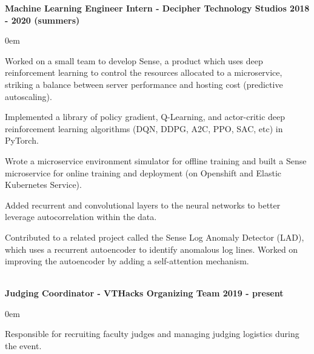 \documentclass{article}
\begin{document}
\begin{center}
\begin{flushleft}
    \textbf{Machine Learning Engineer Intern - Decipher Technology Studios \hfill 2018 - 2020 (summers)}
    \begin{compactitem}
      \itemsep0em
      \item Worked on a small team to develop Sense, a product which uses deep reinforcement learning to control the resources allocated to a microservice, striking a balance between server performance and hosting cost (predictive autoscaling).
      \item Implemented a library of policy gradient, Q-Learning, and actor-critic deep reinforcement learning algorithms (DQN, DDPG, A2C, PPO, SAC, etc) in PyTorch.
      \item Wrote a microservice environment simulator for offline training and built a Sense microservice for online training and deployment (on Openshift and Elastic Kubernetes Service).
      \item Added recurrent and convolutional layers to the neural networks to better leverage autocorrelation within the data.
      \item Contributed to a related project called the Sense Log Anomaly Detector (LAD), which uses a recurrent autoencoder to identify anomalous log lines. Worked on improving the autoencoder by adding a self-attention mechanism.
    \end{compactitem}


    {\large\textbf{\underline{}}} \\

    \textbf{Judging Coordinator - VTHacks Organizing Team \hfill 2019 - present}
    \begin{compactitem}
      \itemsep0em
      \item Responsible for recruiting faculty judges and managing judging logistics during the event.
    \end{compactitem}


\end{flushleft}
\end{center}
\end{document}
